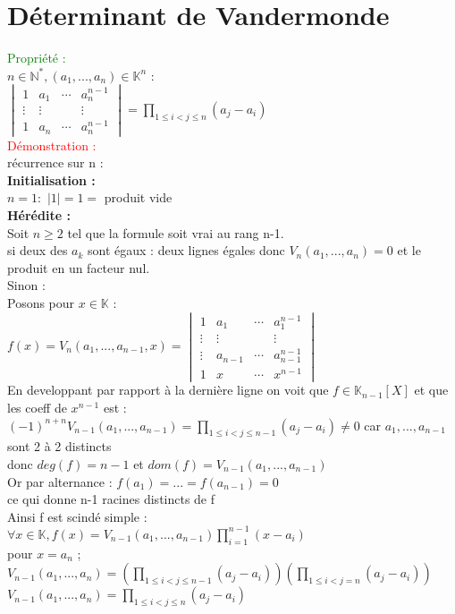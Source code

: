 \documentclass{article}
\begin{document}
\section{Déterminant de Vandermonde}
\textcolor{green}{Propriété :} \\
$n \in \mathbb N^*,(a_1,...,a_n)\in \mathbb K^n$ : \\
$\begin{vmatrix}
1 & a_1 & \cdots & a_n^{n-1} \\
\vdots & \vdots & &\vdots \\  1 & a_n & \cdots &a_n^{n-1}  \end{vmatrix} = \prod_{1 \leq i < j \leq n}(a_j-a_i)$ \\
\textcolor{red}{Démonstration :} \\
récurrence sur n : \\
{\bf Initialisation :} \\
$n=1 :$ $|1|=1=$ produit vide \\
{\bf Hérédite :} \\
Soit $n \geq 2$ tel que la formule soit vrai au rang n-1. \\
si deux des $a_k$ sont égaux : deux lignes égales donc $V_n(a_1,...,a_n)=0$ et le produit en un facteur nul. \\
Sinon : \\
Posons pour $x \in \mathbb K$ : \\
$f(x)=V_n(a_1,...,a_{n-1},x) = \begin{vmatrix}
1 & a_1 &\cdots &a_1^{n-1} \\
\vdots & \vdots & &\vdots \\
\vdots & a_{n-1} & \cdots & a_{n-1}^{n-1} \\
1 & x & \cdots &x^{n-1}
\end{vmatrix}$ \\
En developpant par rapport à la dernière ligne on voit que $f \in \mathbb K_{n-1}[X]$ et que les coeff de $x^{n-1}$ est : \\
$(-1)^{n+n} V_{n-1}(a_1,...,a_{n-1}) = \prod_{1 \leq i < j \leq n-1} (a_j-a_i) \neq 0$ car $a_1,...,a_{n-1}$ sont 2 à 2 distincts \\
donc $deg(f)=n-1$ et $dom(f)=V_{n-1}(a_1,...,a_{n-1})$ \\
Or par alternance : $f(a_1)=...=f(a_{n-1})=0$ \\
ce qui donne n-1 racines distincts de f \\
Ainsi f est scindé simple : \\
$\forall x \in \mathbb K, f(x)=V_{n-1}(a_1,...,a_{n-1})\prod_{i=1}^{n-1}(x-a_i)$ \\
pour $x=a_n$ ; \\
$V_{n-1}(a_1,...,a_n)= (\prod_{1 \leq i<j \leq n-1}(a_j-a_i))(\prod_{1 \leq i <j = n}(a_j-a_i))$ \\
$V_{n-1}(a_1,...,a_n)= \prod_{1 \leq i <j \leq n} (a_j-a_i)$
\end{document}
